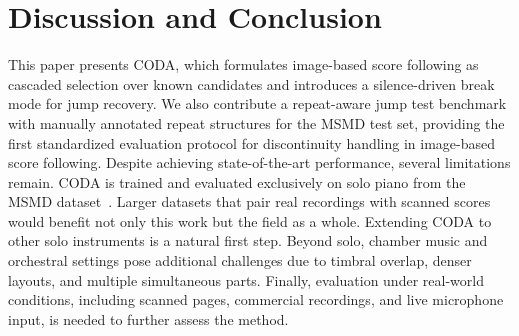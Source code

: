 \section{Discussion and Conclusion}\label{sec:conclusion}
This paper presents CODA, which formulates image-based score following as
cascaded selection over known candidates and introduces a silence-driven
break mode for jump recovery. We also contribute a repeat-aware jump test benchmark with manually annotated repeat structures for the MSMD test set, providing the first standardized evaluation protocol for discontinuity handling in image-based score following. Despite achieving state-of-the-art performance, several limitations remain. CODA is trained and evaluated exclusively on solo piano from the MSMD dataset~\cite{dorfer2018learning}. Larger datasets that pair real recordings with scanned scores would benefit not only this work but the field as a whole. Extending CODA to other solo instruments is a natural first step. Beyond solo, chamber music and orchestral settings pose additional challenges due to timbral overlap, denser layouts, and multiple simultaneous parts. Finally, evaluation under real-world conditions, including scanned pages, commercial recordings, and live microphone input, is needed to further assess the method.

